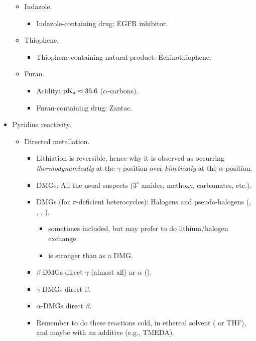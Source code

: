 \documentclass[../notes.tex]{subfiles}
\begin{document}
\begin{itemize}
\begin{itemize}
\begin{itemize}
        \end{itemize}
        \item Indazole.
        \begin{itemize}
            \item Indazole-containing drug: EGFR inhibitor.
        \end{itemize}
        \item Thiophene.
        \begin{itemize}
            \item Thiophene-containing natural product: Echinothiophene.
        \end{itemize}
        \item Furan.
        \begin{itemize}
            \item Acidity: $\operatorname{\text{p}K_\text{a}}\approx 35.6$ ($\alpha$-carbons).
            \item Furan-containing drug: Zantac.
        \end{itemize}
    \end{itemize}
    \item Pyridine reactivity.
    \begin{itemize}
        \item Directed metallation.
        \begin{itemize}
            \item Lithiation is reversible, hence why it is observed as occurring \emph{thermodynamically} at the $\gamma$-position over \emph{kinetically} at the $\alpha$-position.
            \item DMGs: All the usual suspects ($3^\circ$ amides, methoxy, carbamates, etc.).
            \item DMGs (for $\pi$-deficient heterocycles): Halogens and pseudo-halogens (, , , ).
            \begin{itemize}
                \item {} sometimes included, but may prefer to do lithium/halogen exchange.
                \item {} is stronger than  as a DMG.
            \end{itemize}
            \item $\beta$-DMGs direct $\gamma$ (almost all) or $\alpha$ ().
            \item $\gamma$-DMGs direct $\beta$.
            \item $\alpha$-DMGs direct $\beta$.
            \item Remember to do these reactions cold, in ethereal solvent ( or THF), and maybe with an additive (e.g., TMEDA).

\end{itemize}
\end{itemize}
\end{itemize}
\end{document}
